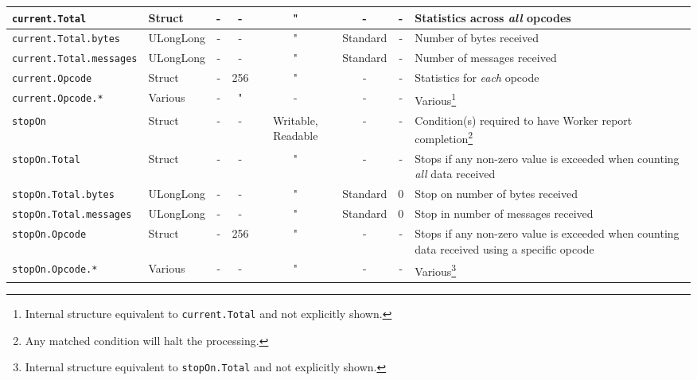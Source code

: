 \documentclass{article}
\begin{document}
\begin{landscape}
\begin{minipage}{\textwidth}
\begin{scriptsize}
\begin{tabular}{|p{3cm}|p{1.5cm}|c|c|c|c|c|p{7cm}|}
      \hline
      \verb+current.Total+          & Struct    & -              & -               & "                  & -           & -             & Statistics across \textit{all} opcodes \\
      \hline
      \verb+current.Total.bytes+    & ULongLong & -              & -               & "                  & Standard    & -             & Number of bytes received \\
      \hline
      \verb+current.Total.messages+ & ULongLong & -              & -               & "                  & Standard    & -             & Number of messages received \\
      \hline
      \verb+current.Opcode+         & Struct    & -              & 256             & "                  & -           & -             & Statistics for \textit{each} opcode \\
      \hline
      \verb+current.Opcode.*+       & Various   & -              & "               & -                  & -           & -             & Various\footnote{Internal structure equivalent to \texttt{current.Total} and not explicitly shown.} \\
      \hline
      \verb+stopOn+                 & Struct    & -              & -               & Writable, Readable & -           & -             & Condition(s) required to have Worker report completion\footnote{Any matched condition will halt the processing.} \\
      \hline
      \verb+stopOn.Total+           & Struct    & -              & -               & "                  & -           & -             & Stops if any non-zero value is exceeded when counting \textit{all} data received \\
      \hline
      \verb+stopOn.Total.bytes+     & ULongLong & -              & -               & "                  & Standard    & 0             & Stop on number of bytes received \\
      \hline
      \verb+stopOn.Total.messages+  & ULongLong & -              & -               & "                  & Standard    & 0             & Stop in number of messages received \\
      \hline
      \verb+stopOn.Opcode+          & Struct    & -              & 256             & "                  & -           & -             & Stops if any non-zero value is exceeded when counting data received using a specific opcode \\
      \hline
      \verb+stopOn.Opcode.*+        & Various   & -              & -               & "                  & -           & -             & Various\footnote{\label{stopon}Internal structure equivalent to \texttt{stopOn.Total} and not explicitly shown.} \\

\end{tabular}
\end{scriptsize}
\end{minipage}
\end{landscape}
\end{document}
